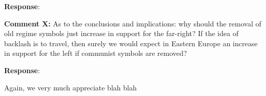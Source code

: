 \documentclass[12pt, a4paper, notitlepage]{article}
\begin{document}
\textbf{Response}: {\color{red}{pending}}

\textbf{Comment X:} As to the conclusions and implications: why should the removal of old regime symbols just increase in support for the far-right? If the idea of backlash is to travel, then surely we would expect in Eastern Europe an increase in support for the left if communist symbols are removed?

\textbf{Response}: {\color{red}{pending}}

\vspace{30pt}

Again, we very much appreciate  blah blah

\newpage


\end{document}

